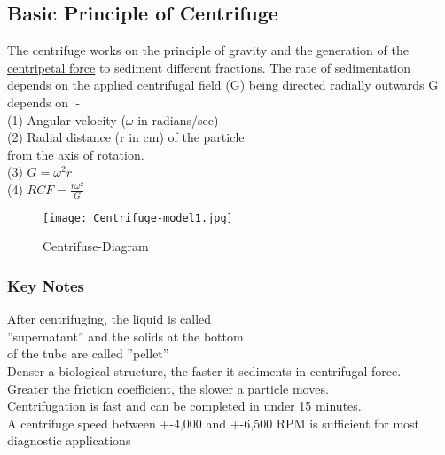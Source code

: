 \documentclass[12pt]{article}
\begin{document}
\subsection{Basic Principle of Centrifuge}
The centrifuge works on the principle of gravity and the generation of the \href{https://byjus.com/physics/centripetal-and-centrifugal-force/}{centripetal force} to sediment different fractions. The rate of sedimentation depends on the applied centrifugal field (G) being directed radially outwards G depends on :-\\
(1) Angular velocity ($\omega$ in radians/sec)\\
(2) Radial distance (r in cm) of the particle\\ from the axis of rotation.\\
(3) $G = \omega^{2}r$\\
(4) $RCF = \frac{r\omega^2}{G}$\\
\begin{wrapfigure}{h}{0.4\textwidth}
\vspace{-3.4cm}
  \texttt{[image: Centrifuge-model1.jpg]}
  \caption{Centrifuse-Diagram}
  \label{fig:Centrifuse-model}
 \end{wrapfigure}
 
\vspace{-7mm}
\subsubsection{Key Notes}

 After centrifuging, the liquid is called\\ ''supernatant'' and the solids at the bottom \\of the tube are called ''pellet''\\
 Denser a biological structure, the faster it sediments in centrifugal force.\\
 Greater the friction coefficient, the slower a particle moves.\\
 Centrifugation is fast and can be completed in under 15 minutes.\\
 A centrifuge speed between +-4,000 and +-6,500 RPM is sufficient for most diagnostic applications
\vspace{-5mm}
\end{document}
